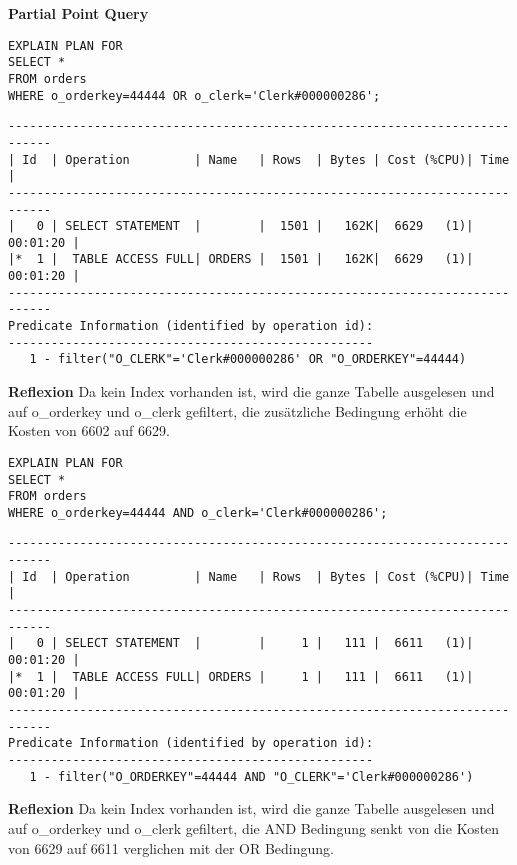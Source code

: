 \documentclass[10pt]{article}
\begin{document}
\textbf{Partial Point Query}
\begin{lstlisting}[style=sql]
EXPLAIN PLAN FOR
SELECT *
FROM orders
WHERE o_orderkey=44444 OR o_clerk='Clerk#000000286';
\end{lstlisting}
\begin{lstlisting}[style=queryexecutionplan]
----------------------------------------------------------------------------
| Id  | Operation         | Name   | Rows  | Bytes | Cost (%CPU)| Time     |
----------------------------------------------------------------------------
|   0 | SELECT STATEMENT  |        |  1501 |   162K|  6629   (1)| 00:01:20 |
|*  1 |  TABLE ACCESS FULL| ORDERS |  1501 |   162K|  6629   (1)| 00:01:20 |
----------------------------------------------------------------------------
Predicate Information (identified by operation id):
---------------------------------------------------
   1 - filter("O_CLERK"='Clerk#000000286' OR "O_ORDERKEY"=44444)
\end{lstlisting}
\textbf{Reflexion} \newline
Da kein Index vorhanden ist, wird die ganze Tabelle ausgelesen und auf o\_orderkey und o\_clerk gefiltert, die zusätzliche Bedingung erhöht die Kosten von 6602 auf 6629.

\begin{lstlisting}[style=sql]
EXPLAIN PLAN FOR
SELECT *
FROM orders
WHERE o_orderkey=44444 AND o_clerk='Clerk#000000286';
\end{lstlisting}
\begin{lstlisting}[style=queryexecutionplan]
----------------------------------------------------------------------------
| Id  | Operation         | Name   | Rows  | Bytes | Cost (%CPU)| Time     |
----------------------------------------------------------------------------
|   0 | SELECT STATEMENT  |        |     1 |   111 |  6611   (1)| 00:01:20 |
|*  1 |  TABLE ACCESS FULL| ORDERS |     1 |   111 |  6611   (1)| 00:01:20 |
----------------------------------------------------------------------------
Predicate Information (identified by operation id):
---------------------------------------------------
   1 - filter("O_ORDERKEY"=44444 AND "O_CLERK"='Clerk#000000286')
\end{lstlisting}
\textbf{Reflexion} \newline
Da kein Index vorhanden ist, wird die ganze Tabelle ausgelesen und auf o\_orderkey und o\_clerk gefiltert, die AND Bedingung senkt von die Kosten von 6629 auf 6611 verglichen mit der OR Bedingung.
\end{document}

